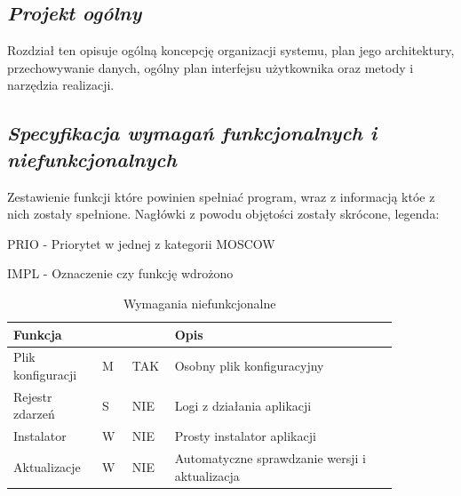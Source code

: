 \documentclass[a4paper,10pt, twoside]{report}
\newcommand{\customstylechapter}[1]{\large{\textit{#1}}}
\newcommand{\customstylesection}[1]{\textbf{\textit{#1}}}
\newcommand{\customstyletable}[1]{\footnotesize{\textbf{#1}}}
\newcommand{\customstyletablecentered}[1]{\footnotesize\centering{\textbf{#1}}}
\begin{document}
\begin{large}
\chapter{\customstylechapter{Projekt ogólny}}
{Rozdział ten opisuje ogólną koncepcję organizacji systemu, plan jego 
architektury, przechowywanie danych, ogólny plan interfejsu użytkownika oraz 
metody i narzędzia realizacji.}


\section{\customstylesection{Specyfikacja wymagań funkcjonalnych i niefunkcjonalnych}}
{Zestawienie funkcji które powinien spełniać program, wraz z informacją któe 
z nich zostały spełnione. Nagłówki z powodu objętości zostały skrócone, legenda:}

{PRIO - Priorytet w jednej z kategorii MOSCOW \cite{MOSCOW}}

{IMPL - Oznaczenie czy funkcję wdrożono}

\begin{table}[H] %
    \caption{Wymagania niefunkcjonalne}
    \label{Wymagania niefunkcjonalne}
    \footnotesize
    \begin{tabular}{|p{0.2\linewidth}|p{0.07\linewidth}|p{0.07\linewidth}|p{0.52\linewidth}|}  %
    \hline                  %
    \customstyletable{Funkcja} & \customstyletablecentered{PRIO} & \customstyletablecentered{IMPL}& \customstyletable{Opis} \\
    \hline
    {Plik konfiguracji} & {M} & {TAK} & {Osobny plik konfiguracyjny}\\
    \hline
    {Rejestr zdarzeń} & {S} & {NIE} & {Logi z działania aplikacji}\\
    \hline
    {Instalator} & {W} & {NIE} & {Prosty instalator aplikacji}\\
    \hline
    {Aktualizacje} & {W} & {NIE} & {Automatyczne sprawdzanie wersji i aktualizacja}\\
    \hline
    \end{tabular}
\end{table}


\end{large}
\end{document}
